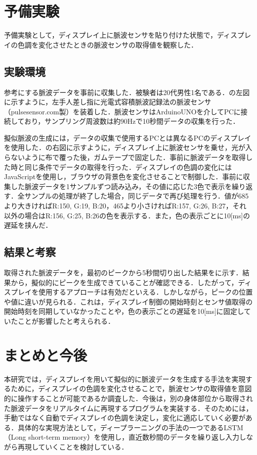 \documentclass[submit,techrep]{ipsj}
\begin{document}
\section{予備実験}
予備実験として，ディスプレイ上に脈波センサを貼り付けた状態で，ディスプレイの色調を変化させたときの脈波センサの取得値を観察した．

\subsection{実験環境}
参考にする脈波データを事前に収集した．被験者は20代男性1名である．の左図に示すように，左手人差し指に光電式容積脈波記録法の脈波センサ（pulsesensor.com製）を装着した．脈波センサはArduinoUNOを介してPCに接続しており，サンプリング周波数は約90Hzで10秒間データの収集を行った．
\par

擬似脈波の生成には，データの収集で使用するPCとは異なるPCのディスプレイを使用した．の右図に示すように，ディスプレイ上に脈波センサを乗せ，光が入らないように布で覆った後，ガムテープで固定した．事前に脈波データを取得した時と同じ条件でデータの取得を行った．ディスプレイの色調の変化にはJavaScriptを使用し，ブラウザの背景色を変化させることで制御した．事前に収集した脈波データを1サンプルずつ読み込み，その値に応じた3色で表示を繰り返す．全サンプルの処理が終了した場合，同じデータで再び処理を行う．値が685より大きければR:150, G:19, B:20，465より小さければR:157, G:26, B:27，それ以外の場合はR:156, G:25, B:26の色を表示する．また，色の表示ごとに10[ms]の遅延を挟んだ．

\subsection{結果と考察}
取得された脈波データを，最初のピークから5秒間切り出した結果をに示す．結果から，擬似的にピークを生成できていることが確認できる．したがって，ディスプレイを使用するアプローチは有効だといえる．しかしながら，ピークの位置や値に違いが見られる．これは，ディスプレイ制御の開始時刻とセンサ値取得の開始時刻を同期していなかったことや，色の表示ごとの遅延を10[ms]に固定していたことが影響したと考えられる．


\section{まとめと今後}
本研究では，ディスプレイを用いて擬似的に脈波データを生成する手法を実現するために，ディスプレイの色調を変化させることで，脈波センサの取得値を意図的に操作することが可能であるか調査した．今後は，別の身体部位から取得された脈波データをリアルタイムに再現するプログラムを実装する．そのためには，手動ではなく自動でディスプレイの色調を決定し，変化に適応していく必要がある．具体的な実現方法として，ディープラーニングの手法の一つであるLSTM（Long short-term memory）を使用し，直近数秒間のデータを繰り返し入力しながら再現していくことを検討している．
\end{document}
